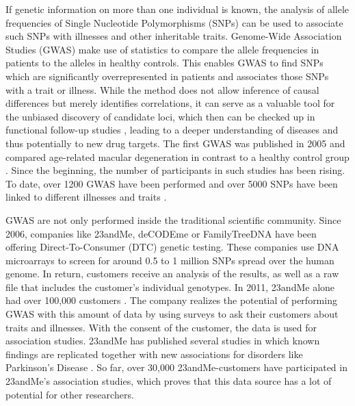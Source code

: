 \documentclass[10pt]{article}
\begin{document}


If genetic information on more than one individual is known, the analysis of
allele frequencies of Single Nucleotide Polymorphisms (SNPs) can be used to associate such SNPs with illnesses and other inheritable traits. Genome-Wide Association Studies
(GWAS) make use of statistics to compare the allele frequencies in patients to the alleles in healthy controls. This
enables GWAS to find SNPs which are significantly overrepresented in patients and associates those SNPs with a trait or illness.
While the method does not allow inference of causal differences but merely identifies correlations, it can serve as a valuable tool for the unbiased discovery of candidate loci, which then can be checked up in functional follow-up studies \cite{10.1371/journal.pgen.1002584}, leading to a deeper understanding of diseases and thus potentially to new drug targets.  
The first GWAS was published in 2005 and compared age-related macular degeneration in contrast 
to a healthy control group \cite{Klein2005}. Since the beginning, the number of participants in 
such studies has been rising. To date, over 1200 GWAS have been performed \cite{Johnson2009} and over 
5000 SNPs have been linked to different illnesses and traits \cite{Hindorff2009}.   

GWAS are not only performed inside the traditional scientific community. 
Since 2006, companies like 23andMe, deCODEme or FamilyTreeDNA have been offering Direct-To-Consumer (DTC) genetic testing. 
These companies use DNA microarrays to screen for around 0.5 to 1 million SNPs spread over the human genome. In return, customers 
receive an analysis of the results, as well as a raw file that includes the customer's individual genotypes. In 2011, 23andMe 
alone had over 100,000 customers \cite{23andMe2011}. The company realizes the potential of performing GWAS with this amount of data by using surveys to ask their customers about 
traits and illnesses. With the consent of the customer, the data is used for association studies. 23andMe has published several 
studies in which known findings are replicated together with new associations for disorders like Parkinson's Disease \cite{Eriksson2010, Do2011}. 
So far, over 30,000 23andMe-customers have participated in 23andMe's association studies, which proves that this data source has a lot of potential for other researchers.
\end{document}
